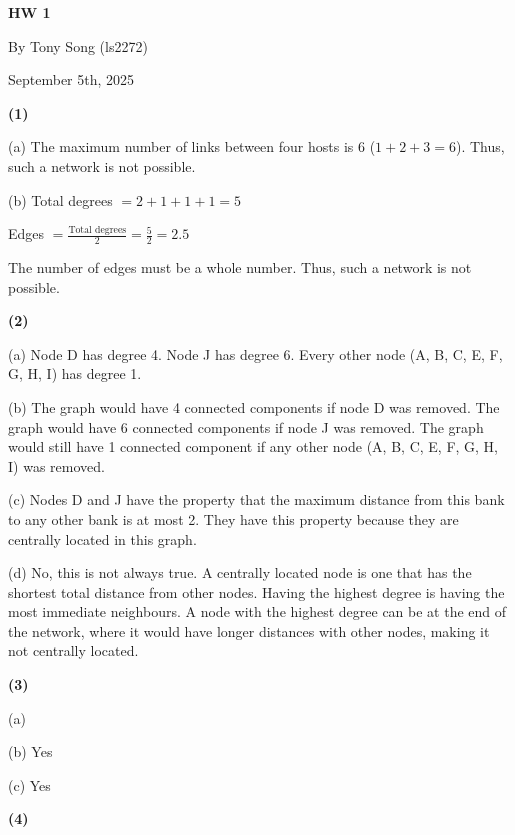 \documentclass[14pt, letterpaper, oneside]{extarticle}
\begin{document}

\begin{titlepage}
    \vspace*{\fill} %
    \centering
    {\Huge \textbf{HW 1} \par}
    {\vspace{2cm}}
    {\LARGE By Tony Song (ls2272) \par}
    {\vspace{2cm}}
    {\LARGE September 5th, 2025 \par}
    \vspace*{\fill}
\end{titlepage}

\newpage
\textbf{(1)}

(a) The maximum number of links between four hosts is 6 ($1 + 2 + 3 = 6$).
Thus, such a network is not possible.

(b) Total degrees $= 2 + 1 + 1 + 1 = 5$

Edges $= \frac{\text{Total degrees}}{2} = \frac{5}{2} = 2.5$

The number of edges must be a whole number. Thus, such a network is not possible.

\textbf{(2)}

(a) Node D has degree 4. Node J has degree 6.
Every other node (A, B, C, E, F, G, H, I) has degree 1.

(b) The graph would have 4 connected components if node D was removed.
The graph would have 6 connected components if node J was removed.
The graph would still have 1 connected component if any other node (A, B, C, E, F, G, H, I) was removed.

(c) Nodes D and J have the property that the maximum distance from this bank to any other bank is at most 2.
They have this property because they are centrally located in this graph.

(d) No, this is not always true. A centrally located node is one that has the shortest total distance from other nodes.
Having the highest degree is having the most immediate neighbours. A node with the highest degree can be at the end of the network,
where it would have longer distances with other nodes, making it not centrally located.


\textbf{(3)}

(a) %

(b) Yes %

(c) Yes %

\textbf{(4)}
\end{document}

